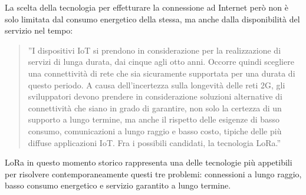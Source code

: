 \documentclass[a4paper]{report} %
\begin{document}
La scelta della tecnologia per effetturare la connessione ad Internet però non è solo limitata dal consumo energetico della stessa, ma anche dalla disponibilità del servizio nel tempo: 
\begin{quote}
	''I dispositivi IoT si prendono in considerazione per la realizzazione di servizi di lunga durata, dai cinque agli otto anni. Occorre quindi scegliere una connettività di rete che sia sicuramente supportata per una durata di questo periodo. A causa dell'incertezza sulla longevità delle reti 2G, gli sviluppatori devono prendere in considerazione soluzioni alternative di connettività che siano in grado di garantire, non solo la certezza di un supporto a lungo termine, ma anche il rispetto delle esigenze di basso consumo, comunicazioni a lungo raggio e basso costo, tipiche delle più diffuse applicazioni IoT. Fra i possibili candidati, la tecnologia LoRa.''
\end{quote}
LoRa in questo momento storico rappresenta una delle tecnologie più appetibili per risolvere contemporaneamente questi tre problemi: connessioni a lungo raggio, basso consumo energetico e servizio garantito a lungo termine.
\end{document}
